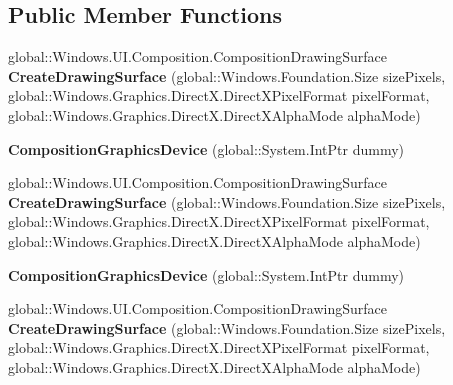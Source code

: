 \subsection*{Public Member Functions}
\begin{DoxyCompactItemize}
\item 
\mbox{\label{class_windows_1_1_u_i_1_1_composition_1_1_composition_graphics_device_a0a3fdd5fc870a487451732595e327ea4}} 
global\+::\+Windows.\+U\+I.\+Composition.\+Composition\+Drawing\+Surface {\bfseries Create\+Drawing\+Surface} (global\+::\+Windows.\+Foundation.\+Size size\+Pixels, global\+::\+Windows.\+Graphics.\+Direct\+X.\+Direct\+X\+Pixel\+Format pixel\+Format, global\+::\+Windows.\+Graphics.\+Direct\+X.\+Direct\+X\+Alpha\+Mode alpha\+Mode)
\item 
\mbox{\label{class_windows_1_1_u_i_1_1_composition_1_1_composition_graphics_device_ad669d790e4fa24aa3b6ad0b412250a00}} 
{\bfseries Composition\+Graphics\+Device} (global\+::\+System.\+Int\+Ptr dummy)
\item 
\mbox{\label{class_windows_1_1_u_i_1_1_composition_1_1_composition_graphics_device_a0a3fdd5fc870a487451732595e327ea4}} 
global\+::\+Windows.\+U\+I.\+Composition.\+Composition\+Drawing\+Surface {\bfseries Create\+Drawing\+Surface} (global\+::\+Windows.\+Foundation.\+Size size\+Pixels, global\+::\+Windows.\+Graphics.\+Direct\+X.\+Direct\+X\+Pixel\+Format pixel\+Format, global\+::\+Windows.\+Graphics.\+Direct\+X.\+Direct\+X\+Alpha\+Mode alpha\+Mode)
\item 
\mbox{\label{class_windows_1_1_u_i_1_1_composition_1_1_composition_graphics_device_ad669d790e4fa24aa3b6ad0b412250a00}} 
{\bfseries Composition\+Graphics\+Device} (global\+::\+System.\+Int\+Ptr dummy)
\item 
\mbox{\label{class_windows_1_1_u_i_1_1_composition_1_1_composition_graphics_device_a0a3fdd5fc870a487451732595e327ea4}} 
global\+::\+Windows.\+U\+I.\+Composition.\+Composition\+Drawing\+Surface {\bfseries Create\+Drawing\+Surface} (global\+::\+Windows.\+Foundation.\+Size size\+Pixels, global\+::\+Windows.\+Graphics.\+Direct\+X.\+Direct\+X\+Pixel\+Format pixel\+Format, global\+::\+Windows.\+Graphics.\+Direct\+X.\+Direct\+X\+Alpha\+Mode alpha\+Mode)

\end{DoxyCompactItemize}
